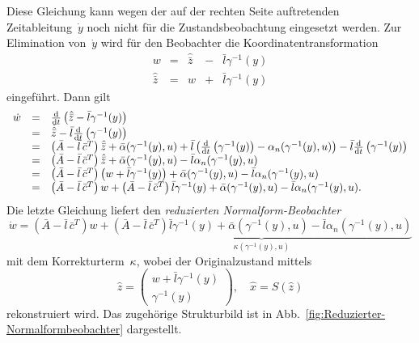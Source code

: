 Diese Gleichung kann wegen der auf der rechten Seite auftretenden
Zeit\-ab\-leitung~$\dot{y}$ noch nicht für die Zustandsbeobachtung
eingesetzt werden. Zur Elimination von~$\dot{y}$ wird für den Beobachter
die Koordinatentransformation 
\[
\begin{array}{ccccc}
w & = & \hat{\bar{z}} & - & \bar{l}\gamma^{-1}(y)\\
\hat{\bar{z}} & = & w & + & \bar{l}\gamma^{-1}(y)
\end{array}
\]
eingeführt. Dann gilt 
\[
\begin{array}{ccl}
\dot{w} & = & \frac{{\mathrm{d}}}{{\mathrm{d}} t}\left(\hat{\bar{z}}-\bar{l}\gamma^{-1}(y)\right)\\
 & = & \dot{\hat{\bar{z}}}-\bar{l}\frac{{\mathrm{d}}}{{\mathrm{d}} t}\left(\gamma^{-1}(y)\right)\\
 & = & \left(\bar{A}-\bar{l}\,\bar{c}^{T}\right)\hat{\bar{z}}+\bar{\alpha}(\gamma^{-1}(y),u)+\bar{l}\left(\frac{{\mathrm{d}}}{{\mathrm{d}} t}\left(\gamma^{-1}(y)\right)-\alpha_{n}(\gamma^{-1}(y),u)\right)-\bar{l}\frac{{\mathrm{d}}}{{\mathrm{d}} t}\left(\gamma^{-1}(y)\right)\\
 & = & \left(\bar{A}-\bar{l}\,\bar{c}^{T}\right)\hat{\bar{z}}+\bar{\alpha}(\gamma^{-1}(y),u)-\bar{l}\alpha_{n}(\gamma^{-1}(y),u)\\
 & = & \left(\bar{A}-\bar{l}\,\bar{c}^{T}\right)\left(w+\bar{l}\gamma^{-1}(y)\right)+\bar{\alpha}(\gamma^{-1}(y),u)-\bar{l}\alpha_{n}(\gamma^{-1}(y),u)\\
 & = & \left(\bar{A}-\bar{l}\,\bar{c}^{T}\right)w+\left(\bar{A}-\bar{l}\,\bar{c}^{T}\right)\bar{l}\gamma^{-1}(y)+\bar{\alpha}(\gamma^{-1}(y),u)-\bar{l}\alpha_{n}(\gamma^{-1}(y),u).
\end{array}
\]
Die letzte Gleichung liefert den \emph{reduzierten Normalform-Beobachter}
\begin{equation}
\dot{w}=\left(\bar{A}-\bar{l}\,\bar{c}^{T}\right)w+\underbrace{\left(\bar{A}-\bar{l}\,\bar{c}^{T}\right)\bar{l}\gamma^{-1}(y)+\bar{\alpha}(\gamma^{-1}(y),u)-\bar{l}\alpha_{n}(\gamma^{-1}(y),u)}_{{\displaystyle \kappa(\gamma^{-1}(y),u)}}\label{eq:red-nf-beob}
\end{equation}
mit dem Korrekturterm~$\kappa$, wobei der Originalzustand mittels
\begin{equation}
\hat{z}=\left(\begin{array}{c}
w+\bar{l}\gamma^{-1}(y)\\
\gamma^{-1}(y)
\end{array}\right),\quad\hat{x}=S(\hat{z})\label{eq:red-nf-ruecktransf}
\end{equation}
rekonstruiert wird. Das zugehörige Strukturbild ist in Abb.~\ref{fig:Reduzierter-Normalformbeobachter}
dargestellt.

